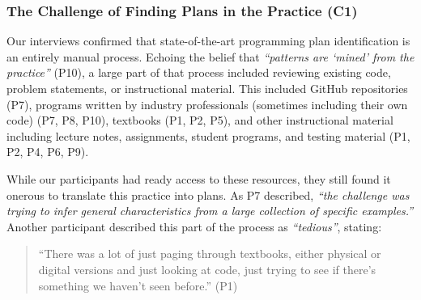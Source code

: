 


\subsubsection{The Challenge of Finding Plans in the Practice (C1)} 
\label{sec:challenges_practice}
Our interviews confirmed that state-of-the-art programming plan identification is an entirely manual process. Echoing the belief that \textit{``patterns are `mined' from the practice''} (P10), a large part of that process included reviewing existing code, problem statements, or instructional material. This included GitHub repositories (P7), programs written by industry professionals (sometimes including their own code) (P7, P8, P10), textbooks (P1, P2, P5), and other instructional material including lecture notes, assignments, student programs, and testing material (P1, P2, P4, P6, P9).

While our participants had ready access to these resources, they still found it onerous to translate this practice into plans. As P7 described, \textit{``the challenge was trying to infer general characteristics from a large collection of specific examples.''} Another participant described this part of the process as \textit{``tedious''}, stating: 

\begin{quote}
``There was a lot of just paging through textbooks, either physical or digital versions and just looking at code, just trying to see if there's something we haven't seen before.'' (P1)
\end{quote}

